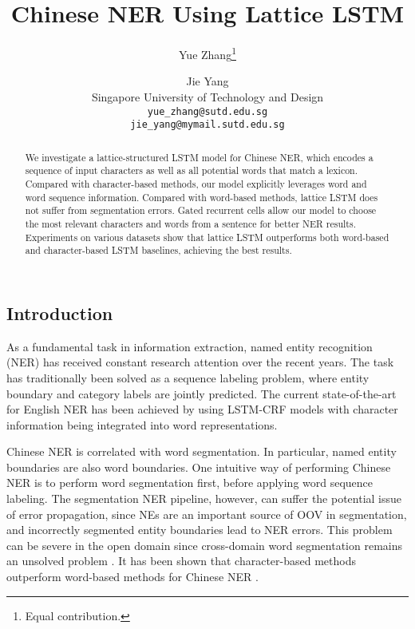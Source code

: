 \documentclass[11pt,a4paper]{article}
\title{Chinese NER Using Lattice LSTM}
\author{Yue Zhang\thanks{\quad Equal contribution.} \and Jie Yang\samethanks\\ 
  Singapore University of Technology and Design \\
  {\tt yue\_zhang@sutd.edu.sg} \\
  {\tt jie\_yang@mymail.sutd.edu.sg} \\}
\date{}
\begin{document}
\begin{CJK*}{UTF8}{gbsn}
\maketitle
\begin{abstract}
We investigate a lattice-structured LSTM model for Chinese NER, which encodes a sequence of input characters as well as all potential words that match a lexicon. Compared with character-based methods, our model explicitly leverages word and word sequence information. Compared with word-based methods, lattice LSTM does not suffer from segmentation errors. Gated recurrent cells allow our model to choose the most relevant characters and words from a sentence for better NER results. Experiments on various datasets show that lattice LSTM outperforms both word-based and character-based LSTM baselines, achieving the best results. 
\end{abstract}


\section{Introduction}

As a fundamental task in information extraction, named entity recognition (NER) has received constant research attention over the recent years. The task has traditionally been solved as a sequence labeling problem, where entity boundary and category labels are jointly predicted. The current state-of-the-art for English NER has been achieved by using LSTM-CRF models \cite{lample2016neural,ma2016end,chiu2015named,liu2017empower} with character information being integrated into word representations. 


Chinese NER is correlated with word segmentation. In particular, named entity boundaries are also word boundaries. One intuitive way of performing Chinese NER is to perform word segmentation first, before applying word sequence labeling. The segmentation  NER pipeline, however, can suffer the potential issue of error propagation, since NEs are an important source of OOV in segmentation, and incorrectly segmented entity boundaries lead to NER errors. This problem can be severe in the open domain since cross-domain word segmentation remains an unsolved problem \cite{liu2012unsupervised,jiang2013discriminative,liu2014domain,qiu2015word,chen2017adversarial,huang2017addressing}. 
It has been shown that character-based methods outperform word-based methods for Chinese NER \cite{he2008chinese,liu2010chinese,li2014comparison}. 



\end{CJK*}
\end{document}
